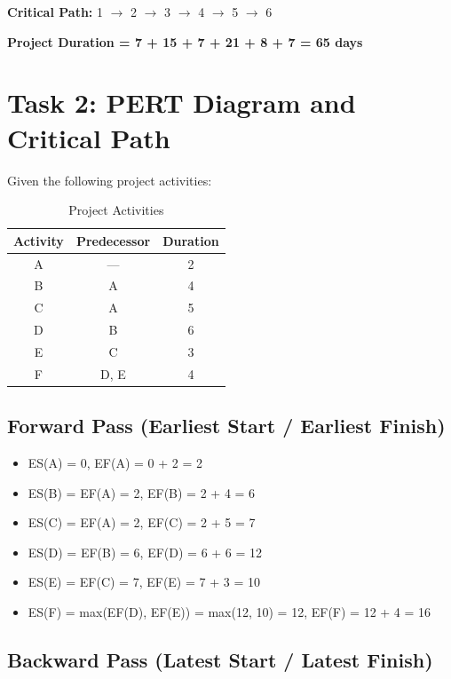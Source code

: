 \documentclass[10pt,a4paper]{article}
\begin{document}
\vspace{0.2cm}
\noindent\textbf{Critical Path:} 1 $\to$ 2 $\to$ 3 $\to$ 4 $\to$ 5 $\to$ 6

\noindent\textbf{Project Duration = 7 + 15 + 7 + 21 + 8 + 7 = 65 days}

\newpage
\section*{Task 2: PERT Diagram and Critical Path}

Given the following project activities:

\begin{table}[h!]
\centering
\renewcommand{\arraystretch}{1.15}
\begin{tabular}{|c|c|c|}
\hline
\textbf{Activity} & \textbf{Predecessor} & \textbf{Duration} \\ \hline
A & --- & 2 \\ \hline
B & A & 4 \\ \hline
C & A & 5 \\ \hline
D & B & 6 \\ \hline
E & C & 3 \\ \hline
F & D, E & 4 \\ \hline
\end{tabular}
\caption*{Project Activities}
\end{table}

\subsection*{Forward Pass (Earliest Start / Earliest Finish)}

\begin{itemize}[nosep]
    \item ES(A) = 0, EF(A) = 0 + 2 = 2
    \item ES(B) = EF(A) = 2, EF(B) = 2 + 4 = 6
    \item ES(C) = EF(A) = 2, EF(C) = 2 + 5 = 7
    \item ES(D) = EF(B) = 6, EF(D) = 6 + 6 = 12
    \item ES(E) = EF(C) = 7, EF(E) = 7 + 3 = 10
    \item ES(F) = max(EF(D), EF(E)) = max(12, 10) = 12, EF(F) = 12 + 4 = 16
\end{itemize}

\subsection*{Backward Pass (Latest Start / Latest Finish)}
\end{document}

